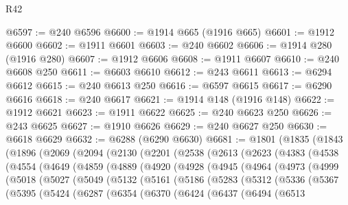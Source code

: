 \begin{lexlean}{R42}
\begin{coremodule}
{@6597 := @240 @6596
@6600 := @1914 @665 (@1916 @665)
@6601 := @1912 @6600
@6602 := @1911 @6601
@6603 := @240 @6602
@6606 := @1914 @280 (@1916 @280)
@6607 := @1912 @6606
@6608 := @1911 @6607
@6610 := @240 @6608 @250
@6611 := @6603 @6610
@6612 := @243 @6611
@6613 := @6294 @6612
@6615 := @240 @6613 @250
@6616 := @6597 @6615
@6617 := @6290 @6616
@6618 := @240 @6617
@6621 := @1914 @148 (@1916 @148)
@6622 := @1912 @6621
@6623 := @1911 @6622
@6625 := @240 @6623 @250
@6626 := @243 @6625
@6627 := @1910 @6626
@6629 := @240 @6627 @250
@6630 := @6618 @6629
@6632 := @6288 (@6290 @6630)
@6681 := @1801
    (@1835
      (@1843
        (@1896
          (@2069
            (@2094
              (@2130
                (@2201
                  (@2538
                    (@2613
                      (@2623
                        (@4383
                          (@4538
                            (@4554
                              (@4649
                                (@4859
                                  (@4889
                                    (@4920
                                      (@4928
                                        (@4945
                                          (@4964
                                            (@4973
                                              (@4999
                                                (@5018
                                                  (@5027
                                                    (@5049
                                                      (@5132
                                                        (@5161
                                                          (@5186
                                                            (@5283
                                                              (@5312
                                                                (@5336
                                                                  (@5367
                                                                    (@5395
                                                                      (@5424
                                                                        (@6287
                                                                          (@6354
                                                                            (@6370
                                                                              (@6424
                                                                                (@6437
                                                                                  (@6494
                                                                                    (@6513
}
\end{coremodule}
\end{lexlean}
